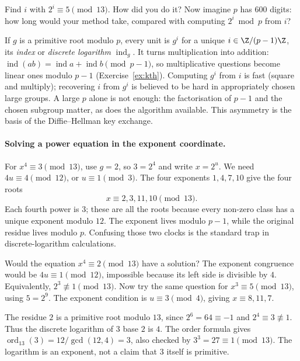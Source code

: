 \begin{think}
Find $i$ with $2^i\equiv5\pmod{13}$. How did you do it? Now imagine $p$ has $600$ digits: how long would your method take, compared with computing $2^i\bmod p$ from $i$?
\end{think}

If $g$ is a primitive root modulo $p$, every unit is $g^i$ for a unique $i\in\Z/(p-1)\Z$, its \emph{index} or \emph{discrete logarithm} $\operatorname{ind}_g$. It turns multiplication into addition: $\operatorname{ind}(ab)=\operatorname{ind}a+\operatorname{ind}b\pmod{p-1}$, so multiplicative questions become linear ones modulo $p-1$ (Exercise~\ref{ex:kth}).
Computing $g^i$ from $i$ is fast (square and multiply); recovering $i$ from $g^i$ is believed to be hard in appropriately chosen large groups. A large $p$ alone is not enough: the factorisation of $p-1$ and the chosen subgroup matter, as does the algorithm available. This asymmetry is the basis of the Diffie--Hellman key exchange.

\paragraph{Solving a power equation in the exponent coordinate.}
For $x^4\equiv3\pmod{13}$, use $g=2$, so $3=2^4$ and write $x=2^u$.
We need $4u\equiv4\pmod{12}$, or $u\equiv1\pmod3$. The four exponents
$1,4,7,10$ give the four roots
\[
 x\equiv2,3,11,10\pmod{13}.
\]
Each fourth power is $3$; these are all the roots because every non-zero
class has a unique exponent modulo $12$. The exponent lives modulo $p-1$,
while the original residue lives modulo $p$. Confusing those two clocks is
the standard trap in discrete-logarithm calculations.

\begin{think}
Would the equation $x^4\equiv2\pmod{13}$ have a solution? The exponent
congruence would be $4u\equiv1\pmod{12}$, impossible because its left side
is divisible by $4$. Equivalently, $2^3\not\equiv1\pmod{13}$.
Now try the same question for $x^3\equiv5\pmod{13}$, using $5=2^9$.
The exponent condition is $u\equiv3\pmod4$, giving $x\equiv8,11,7$.
\end{think}

\begin{examplex}
The residue $2$ is a primitive root modulo $13$, since $2^6=64\equiv -1$ and $2^4\equiv3\not\equiv 1$. Thus the discrete logarithm of $3$ base $2$ is $4$. The order formula gives $\operatorname{ord}_{13}(3)=12/\gcd(12,4)=3$, also checked by $3^3=27\equiv1\pmod{13}$. The logarithm is an exponent, not a claim that $3$ itself is primitive.
\end{examplex}

